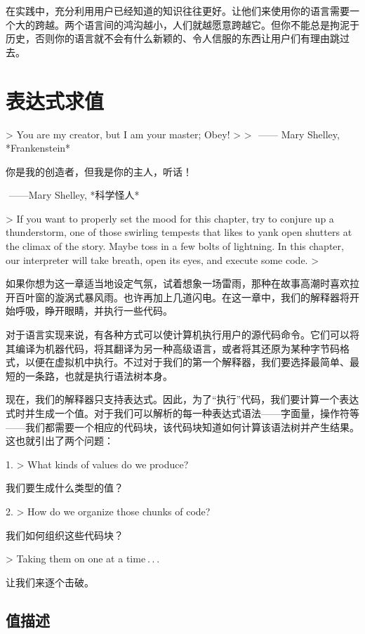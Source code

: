 \documentclass[cn,11pt,chinese]{elegantbook}
\begin{document}
在实践中，充分利用用户已经知道的知识往往更好。让他们来使用你的语言需要一个大的跨越。两个语言间的鸿沟越小，人们就越愿意跨越它。但你不能总是拘泥于历史，否则你的语言就不会有什么新颖的、令人信服的东西让用户们有理由跳过去。

\chapter{表达式求值}

> You are my creator, but I am your master; Obey!
>
> ​																														——  Mary Shelley, *Frankenstein*

你是我的创造者，但我是你的主人，听话！

​																																	——Mary Shelley, *科学怪人*

> If you want to properly set the mood for this chapter, try to conjure up a thunderstorm, one of those swirling tempests that likes to yank open shutters at the climax of the story. Maybe toss in a few bolts of lightning. In this chapter, our interpreter will take breath, open its eyes, and execute some code.
>

如果你想为这一章适当地设定气氛，试着想象一场雷雨，那种在故事高潮时喜欢拉开百叶窗的漩涡式暴风雨。也许再加上几道闪电。在这一章中，我们的解释器将开始呼吸，睁开眼睛，并执行一些代码。

对于语言实现来说，有各种方式可以使计算机执行用户的源代码命令。它们可以将其编译为机器代码，将其翻译为另一种高级语言，或者将其还原为某种字节码格式，以便在虚拟机中执行。不过对于我们的第一个解释器，我们要选择最简单、最短的一条路，也就是执行语法树本身。

现在，我们的解释器只支持表达式。因此，为了“执行”代码，我们要计算一个表达式时并生成一个值。对于我们可以解析的每一种表达式语法——字面量，操作符等——我们都需要一个相应的代码块，该代码块知道如何计算该语法树并产生结果。这也就引出了两个问题：

1. > What kinds of values do we produce?

   我们要生成什么类型的值？

2. > How do we organize those chunks of code?

   我们如何组织这些代码块？

> Taking them on one at a time . . . 

让我们来逐个击破。

\section{值描述}
\end{document}
